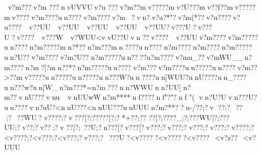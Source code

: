 {{{{{{{{{{{{{{{{{{{{{{{{{{{{{{{{{{{{{{{{{{{{{{{{{{{{{{{{{{{{{{{{{{{{{{{{{{{{{{{{{{{{{{{{{{{{{{{{{{{{{{{{{{{{{{{{{{{{{{{{{{{{{{{{{{{{{{{{{{{{{{{{{{{{{{{{{{{{{{{{{{{{{{{{{{{{{{{{{{{{{{{{{{{{{{{{{{{{{{{{{{{{{{{{{{{{{{{{{{{{{{{{{{{{{{{{{{{{{{{{{{{{{{{{{{{{{{{{{{{{{{{{{{{{{{{{{{{{{{{{{{{{{{{{{{{{{{{{{{{{{{{{{{{{{{{{{{{{{{{{{{{{{{{{{{{{{{{{{{{{{{{{{{{{{{{{{{{{{{{{{{{{{{{{{{{{{{{{{{{{{{{{{{{{{{{{{{{{{{{{{{{{{{{{{{{{{{{{{{{{{{{{{{{{{{{{{{{{{{{{{{{{{{{{{{{{{{{{{{{{{{{{{{{{{{{{{{{{{{{{{{{{{{{{{{{{{{{{{{{{{{{{{{{{{{{{{{{{{{{{{{{{{{{{{{{{{{{{{{{{{{{{{{{{{{{{{{{{{{{{{{{{{{{{{{{{{{{{{{{{{{{{{{{{{{{{{{{{{{{{{{{{{{{{{{{{{{{{{{{{{{{{{{{{{{{{{{{{{{{{{{{{{{{{{{{{{{{{{{{{{{{{{{{{{{{{{{{{{{{{{{{{{{{{{{{{{{{{{{{{{{{{{{{{{{{{{{{{{{{{{{{{{{{{{{{{{{{{{{{{{{{{{{{{{{{{{{{{{{{{{{{{{{{{{{{{{{{{{{{{{{{{{{{{{{{{{{{{{{{{{{{{{{{{{{{{{{{{{{{{{{{{{{{{{{{{{{{{{{{{{{{{{{{{{{{{{{{{{{{{{{{{{{{{{{{{{{{{{{{{{{{{{{{{{{{{{{{{{{{{{{{{{{{{{{{{{{{{{{{{{{{{{{{{{{{{{{{{{{{{{{{{{{{{{{{{{{{{{{{{{{{{{{{{{{{{{{{{{{{{{{{{{{{{{{{{{{{{{{{{{{{{{{{{{{{{{{{{{{{{{{{{{{{{{{{{{{{{{{{{{{{{{{{{{{{{{{{{{{{{{{{{{{{{{{{{{{{{{{{{{{{{{{{{{{{{{{{{{{{{{{{{{{{{{{{{{{{{{{{{{{{{{{{{{{{{{{{{{{{{{{{{{{{{{{{{{{{{{{{{{{{{{{{{{{{{{{{{{{{{{{{{{{{{{{{{{{{{{{{{{{{{{{{{{{{{{{{{{{{{{{{{{{{{{{{{{{{{{{{{{{{{{{{{{{{{{{{{{{{{{{{{{{{{{{{{{{{{{{{{{{{{{{{{{{{{{{{{{{{{{{{{{{{{{{{{{{{{{{{{{{{{{{{{{{{{{{{{{{{{{{{{{{{{{{{{{{{{{{{{{{{{{{{{{{{{{{{{{{{{{{{{{{{{{{{{{{{{{{{{{{{{{{{{{{{{{{{{{{{{{{{{{{{{{{{{{{{{{{{{{{{{{{{{{{{{{{{{{{{{{{{{{{{{{{{{{{{{{{{{{{{{{{{{{{{{{{{{{{{{{{{{{{{{{{{{{{{{{{{{{{{{{{{{{{{{{{{{{{{{{{{{{{{{{{{{{{{{{{{{{{{{{{{{{{{{{{{{{{{{{{{{{{{{{{{{{{{{{{{{{{{{{{{{{{{{{{{{{{{{{{{{{{{{{{{{{{{{{{{{{{{{{{{{{{{{{{{{{{{{{{{{{{{{{{{{{{{{{{{{{{{{{{{{{{{{{{{{{{{{{{{{{{{{{{{{{{{{{{{{{{{{{{{{{{{{{{{{{{{{{{{{{{{{{{{{{{{{{{{{{{{{{{{{{{{{{{{{{{{{{{{{{{{{{{{{{{{{{{{{{{{{{{{{{{{{{{{{{{{{{{{{{{{{{{{{{{{{{{{{{{{{{{{{{{{{{{{{{{{{{{{{{{{{{{{{{{{{{{{{{{{{{{{{{{{{{{{{{{{{{{{{{{{{{{{{{{{{{{{{{{{{{{{{{{{{{{{{{{{{{{{{{{{{{{{{{{{{{{{{{{{{{{{{{{{{{{{{{{{{{{{{{{{{{{{{{{{{{{{{{{{{{{{{{{{{{{{{{{{{{{{{{{{{{{{{{{{{{{{{{{{{{{{{{{{{{{{{{{{{{{{{{{{{{{{{{{{{{{{{{{{{{{{{{{{{{{{{{{{{{{{{{{{{{{{{{{{{{{{{{{{{{{{{{{{{{{{{{{{{{{{{{{{{{{{{{{{{{{{{{{{{{{{{{{{{{{{{{{{{{{{{{{{{{{{{{{{{{{{{{{{{{{{{{{{{{{{{{{{{{{{{{{{{{{{{{{{{{{{{{{{{{{{{{{{{{{{{{{{{{{{{{{{{{{{{{{{{{{{v?m??? v?m
???nvUVVUv?u ???v?m?   ?mv?????mv?U???mv??f??mv?????mv????v?m????un????v?m????v?m?vn?   v?u?*"?v?m(*??v?u????v?u????~v??UU~v??UU~v??UU~v??UU~v??UU?}v???U?v???U?v????~v???W~v?WUU<vvU??Uvn? ?}v????~v??UUv?m????v?m?????un????n?m?????mn?*??n?m???mn????un????n?m????n?m????n?m?????un?U??v?m????v?m?U??n?m?????un????u?m????v?mu_??v?mWU__n?m????n?m}?]?mn??*?n?m?????un????v?m???v?m????un?????un????v?m??>??mv?????un?????un?????un???W?un????un]WUU?unU????un_????un???w?un]W_}n?m???*=n?m???nn?WWUnn?UU]n?m??vnU???vnuvnUUwWn?m****nf????nf"?"?nf "(
vn?U?Uvn???U?un????vn?uU?<nnU???<nnUU???unUUU}n?m?**??n-/??;?v
??;?~ ??;?~??WU?v????;?v???[?;?????[?;?*+?{?;??
??[?;????_;?;???WU[?;???UU;?v  ??;?v ??;?v 
??[?;~ ??U;?n ???[?v ???[?v ???;?v ???;?v ???;?v ???;?v????;?<v????;?<v ???;?<v ???;?v ???;?~???U?<v?????<v?????<v????~<v?z??~<v?UUU}}}}}}}}}}}}}}}}}}}}}}}}}}}}}}}}}}}}}}}}}}}}}}}}}}}}}}}}}}}}}}}}}}}}}}}}}}}}}}}}}}}}}}}}}}}}}}}}}}}}}}}}}}}}}}}}}}}}}}}}}}}}}}}}}}}}}}}}}}}}}}}}}}}}}}}}}}}}}}}}}}}}}}}}}}}}}}}}}}}}}}}}}}}}}}}}}}}}}}}}}}}}}}}}}}}}}}}}}}}}}}}}}}}}}}}}}}}}}}}}}}}}}}}}}}}}}}}}}}}}}}}}}}}}}}}}}}}}}}}}}}}}}}}}}}}}}}}}}}}}}}}}}}}}}}}}}}}}}}}}}}}}}}}}}}}}}}}}}}}}}}}}}}}}}}}}}}}}}}}}}}}}}}}}}}}}}}}}}}}}}}}}}}}}}}}}}}}}}}}}}}}}}}}}}}}}}}}}}}}}}}}}}}}}}}}}}}}}}}}}}}}}}}}}}}}}}}}}}}}}}}}}}}}}}}}}}}}}}}}}}}}}}}}}}}}}}}}}}}}}}}}}}}}}}}}}}}}}}}}}}}}}}}}}}}}}}}}}}}}}}}}}}}}}}}}}}}}}}}}}}}}}}}}}}}}}}}}}}}}}}}}}}}}}}}}}}}}}}}}}}}}}}}}}}}}}}}}}}}}}}}}}}}}}}}}}}}}}}}}}}}}}}}}}}}}}}}}}}}}}}}}}}}}}}}}}}}}}}}}}}}}}}}}}}}}}}}}}}}}}}}}}}}}}}}}}}}}}}}}}}}}}}}}}}}}}}}}}}}}}}}}}}}}}}}}}}}}}}}}}}}}}}}}}}}}}}}}}}}}}}}}}}}}}}}}}}}}}}}}}}}}}}}}}}}}}}}}}}}}}}}}}}}}}}}}}}}}}}}}}}}}}}}}}}}}}}}}}}}}}}}}}}}}}}}}}}}}}}}}}}}}}}}}}}}}}}}}}}}}}}}}}}}}}}}}}}}}}}}}}}}}}}}}}}}}}}}}}}}}}}}}}}}}}}}}}}}}}}}}}}}}}}}}}}}}}}}}}}}}}}}}}}}}}}}}}}}}}}}}}}}}}}}}}}}}}}}}}}}}}}}}}}}}}}}}}}}}}}}}}}}}}}}}}}}}}}}}}}}}}}}}}}}}}}}}}}}}}}}}}}}}}}}}}}}}}}}}}}}}}}}}}}}}}}}}}}}}}}}}}}}}}}}}}}}}}}}}}}}}}}}}}}}}}}}}}}}}}}}}}}}}}}}}}}}}}}}}}}}}}}}}}}}}}}}}}}}}}}}}}}}}}}}}}}}}}}}}}}}}}}}}}}}}}}}}}}}}}}}}}}}}}}}}}}}}}}}}}}}}}}}}}}}}}}}}}}}}}}}}}}}}}}}}}}}}}}}}}}}}}}}}}}}}}}}}}}}}}}}}}}}}}}}}}}}}}}}}}}}}}}}}}}}}}}}}}}}}}}}}}}}}}}}}}}}}}}}}}}}}}}}}}}}}}}}}}}}}}}}}}}}}}}}}}}}}}}}}}}}}}}}}}}}}}}}}}}}}}}}}}}}}}}}}}}}}}}}}}}}}}}}}}}}}}}}}}}}}}}}}}}}}}}}}}}}}}}}}}}}}}}}}}}}}}}}}}}}}}}}}}}}}}}}}}}}}}}}}}}}}}}}}}}}}}}}}}}}}}}}}}}}}}}}}}}}}}}}}}}}}}}}}}}}}}}}}}}}}}}}}}}}}}}}}}}}}}}}}}}}}}}}}}}}}}}}}}}}}}}}}}}}}}}}}}}}}}}}}}}}}}}}}}}}}}}}}}}}}}}}}}}}}}}}}}}}}}}}}}}}}}}}}}}}}}}}}}}}}}}}}}}}}}}}}}}}}}}}}}}}}}}}}}}}}}}}}}}}}}}}}}}}}}}}}}}}}}}}}}}}}}}}}}}}}}}}}}}}}}}}}}}}}}}}}}}}}}}}}}}}}}}}}}}}}}}}}}}}}}}}}}}}}}}}}}}}}}}}}}}}}}}}}}}}}}}}}}}}}}}}}}}}}}}}}}}}}}}}}}}}}}}}}}}}}}}}}}}}}}}}}}}}}}}}}}}}}}}}}}}}}}}}}}}}}}}}}}}}}}}}}}}}}}}}}}}}}}}}}}}}}}}}}}}}}}}}}}}}}}}}}}}}}}}}}}}}}}}}}}}}}}}}}}}}}}}}}}}}}}}}}}}}}}}}}}}}}}}}}}}}}}}}}}}}}}}}}}}}}}}}}}}}}}}}}}}}}}}}}}}}}}}}}}}}}}}}}}}}}}}}}}}}}}}}}}}}}}}}}}}}}}}}}}}}}}}}}}}}}}}}}}}}}}}}}}}}}}}}}}}}}}}}}}}}}}}}}}}}}}}}}}}}}}}}}}}}}}}}}}}}}}}}}}}}}}}}}}}}}}}}}}}}}}}}}}}}}}}}}}}}}}}}}}}}}}}}}}}}}
